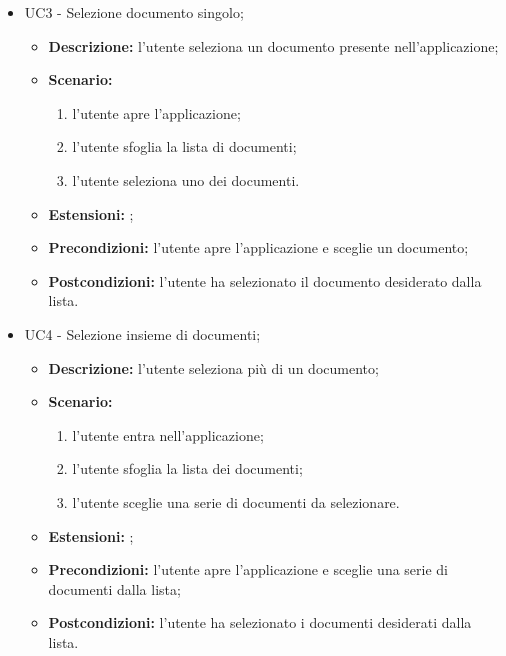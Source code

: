 \documentclass[10pt, a4paper]{article}
\begin{document}
\begin{itemize}
    \item UC3 - Selezione documento singolo;
    \begin{itemize}
        \item \textbf{Descrizione: }l'utente seleziona un documento presente nell'applicazione;
        \item \textbf{Scenario: }
        \begin{enumerate}[label={\arabic*.}, align=left]
        \item l'utente apre l'applicazione;
        \item l'utente sfoglia la lista di documenti;
        \item l'utente seleziona uno dei documenti.
        \end{enumerate}
        \item \textbf{Estensioni: };
        \item \textbf{Precondizioni:} l'utente apre l'applicazione e sceglie un documento;
        \item \textbf{Postcondizioni:} l'utente ha selezionato il documento desiderato dalla lista.\\
    \end{itemize}
    
    \item UC4 - Selezione insieme di documenti;
    \begin{itemize}
        \item \textbf{Descrizione: }l'utente seleziona più di un documento;
        \item \textbf{Scenario: }
        \begin{enumerate}[label={\arabic*.}, align=left]
        \item l'utente entra nell'applicazione;
        \item l'utente sfoglia la lista dei documenti;
        \item l'utente sceglie una serie di documenti da selezionare.
        \end{enumerate}
        \item \textbf{Estensioni: };
        \item \textbf{Precondizioni:} l'utente apre l'applicazione e sceglie una serie di documenti dalla lista;
        \item \textbf{Postcondizioni:} l'utente ha selezionato i documenti desiderati dalla lista.\\
    \end{itemize}
    

\end{itemize}
\end{document}
